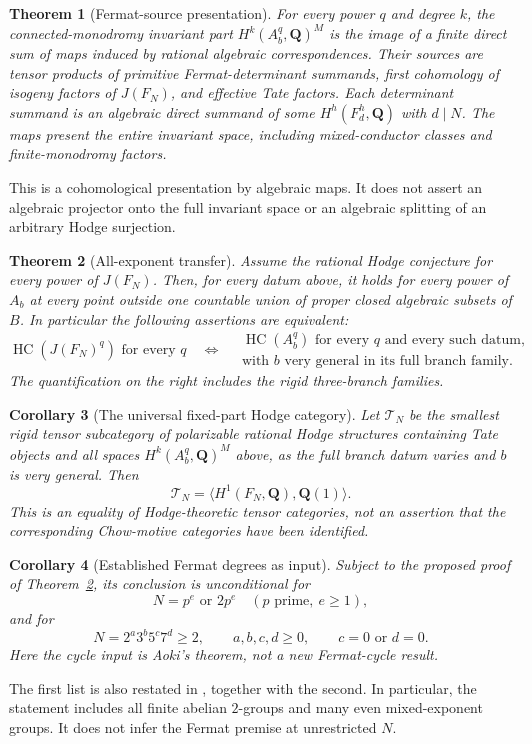 \documentclass[11pt]{article}
\newtheorem{theorem}{Theorem}[section]
\newtheorem{corollary}[theorem]{Corollary}
\theoremstyle{remark}\newtheorem{remark}[theorem]{Remark}
\newcommand{\Q}{\mathbf Q}\newcommand{\C}{\mathbf C}
\DeclareMathOperator{\HC}{HC}\DeclareMathOperator{\CH}{CH}
\begin{document}
\begin{theorem}[Fermat-source presentation]\label{thm:presentation}
For every power $q$ and degree $k$, the connected-monodromy invariant part
$H^k(A_b^q,\Q)^M$ is the image of a finite direct sum of maps induced by
rational algebraic correspondences. Their sources are tensor products of
primitive Fermat-determinant summands, first cohomology of isogeny factors
of $J(F_N)$, and effective Tate factors. Each determinant summand is an
algebraic direct summand of some $H^h(F_d^h,\Q)$ with $d\mid N$.
The maps present the entire invariant space, including mixed-conductor
classes and finite-monodromy factors.
\end{theorem}
This is a cohomological presentation by algebraic maps. It does not assert
an algebraic projector onto the full invariant space or an algebraic
splitting of an arbitrary Hodge surjection.

\begin{theorem}[All-exponent transfer]\label{thm:transfer}
Assume the rational Hodge conjecture for every power of $J(F_N)$. Then,
for every datum above, it holds for every power of $A_b$ at every point
outside one countable union of proper closed algebraic subsets of $B$.
In particular the following assertions are equivalent:
\[
 \HC(J(F_N)^q)\text{ for every }q
 \quad\Longleftrightarrow\quad
 \begin{gathered}
 \HC(A_b^q)\text{ for every }q\text{ and every such datum,}\\
 \text{with }b\text{ very general in its full branch family.}
 \end{gathered}
\]
The quantification on the right includes the rigid three-branch families.
\end{theorem}

\begin{corollary}[The universal fixed-part Hodge category]\label{cor:category}
Let $\mathcal T_N$ be the smallest rigid tensor subcategory of polarizable
rational Hodge structures containing Tate objects and all spaces
$H^k(A_b^q,\Q)^M$ above, as the full branch datum varies and $b$ is very
general. Then
\[
 \mathcal T_N=\langle H^1(F_N,\Q),\Q(1)\rangle.
\]
This is an equality of Hodge-theoretic tensor categories, not an assertion
that the corresponding Chow-motive categories have been identified.
\end{corollary}

\begin{corollary}[Established Fermat degrees as input]\label{cor:aoki}
Subject to the proposed proof of Theorem~\ref{thm:transfer}, its conclusion
is unconditional for
\[
 N=p^e\text{ or }2p^e\quad(p\text{ prime},\ e\geq1),
\]
and for
\[
 N=2^a3^b5^c7^d\geq2,
 \qquad a,b,c,d\geq0,\qquad c=0\text{ or }d=0.
\]
Here the cycle input is Aoki's theorem, not a new Fermat-cycle result.
\end{corollary}
The first list is also restated in \cite[Theorem 1.2]{Aoki02}, together
with the second. In particular, the statement includes all finite abelian
$2$-groups and many even mixed-exponent groups. It does not infer the
Fermat premise at unrestricted $N$.
\end{document}
